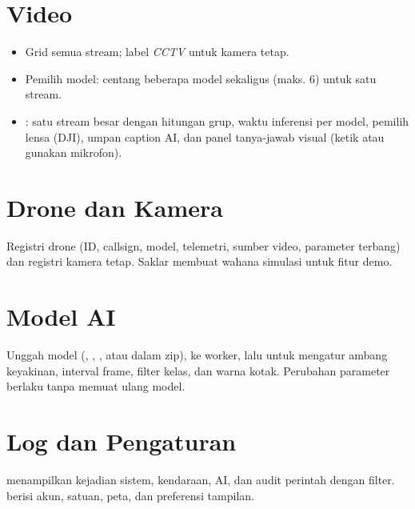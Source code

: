 \section{Video}
\begin{itemize}
\item Grid semua stream; label \emph{CCTV} untuk kamera tetap.
\item Pemilih model: centang beberapa model sekaligus (maks. 6) untuk satu stream.
\item {}: satu stream besar dengan hitungan grup, waktu inferensi per model, pemilih lensa (DJI), umpan caption AI, dan panel tanya-jawab visual (ketik atau gunakan mikrofon).
\end{itemize}

\section{Drone dan Kamera}
Registri drone (ID, callsign, model, telemetri, sumber video, parameter terbang) dan registri kamera tetap. Saklar  membuat wahana simulasi untuk fitur demo.

\section{Model AI}
Unggah model (, , , atau  dalam zip),  ke worker, lalu  untuk mengatur ambang keyakinan, interval frame, filter kelas, dan warna kotak. Perubahan parameter berlaku tanpa memuat ulang model.

\section{Log dan Pengaturan}
 menampilkan kejadian sistem, kendaraan, AI, dan audit perintah dengan filter.  berisi akun, satuan, peta, dan preferensi tampilan.
